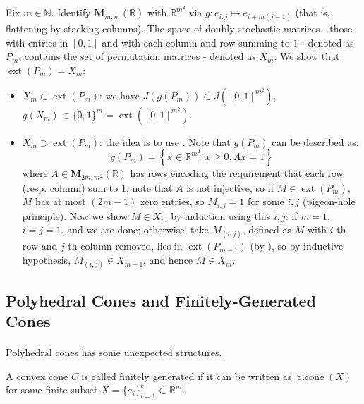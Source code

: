 \begin{exmp}
	Fix $m\in \mathbb{N}$. Identify $\mathbf{M}_{m,m}(\mathbb{R})$ with $\mathbb{R}^{m^2}$ via $g:e_{i,j}\mapsto e_{i+m(j-1)}$ (that is, flattening by stacking columns). The space of doubly stochastic matrices - those with entries in $[0,1]$ and with each column and row summing to $1$ - denoted as $P_{m}$, contains the set of permutation matrices - denoted as $X_m$. We show that $\operatorname{ext}(P_m)=X_m$:
	\begin{itemize}
		\item $X_m\subset \operatorname{ext}(P_m)$: we have $J(g(P_m))\subset J\left([0,1]^{m^2}\right)$, $g(X_m)\subset \{0,1\}^m=\operatorname{ext}\left([0,1]^{m^2}\right)$.
		\item $X_m\supset \operatorname{ext}(P_m)$: the idea is to use . Note that $g(P_m)$ can be described as:
		      \[
			      g(P_m)=\left\{
			      x\in \mathbb{R}^{m^2}:x\geq 0,Ax=1
			      \right\}
		      \]
		      where $A\in \mathbf{M}_{2m,m^2}(\mathbb{R})$ has rows encoding the requirement that each row (resp. column) sum to $1$; note that $A$ is not injective, so if $M\in \operatorname{ext}(P_m)$, $M$ has at most $(2m-1)$ zero entries, so $M_{i,j}=1$ for some $i,j$ (pigeon-hole principle). Now we show $M\in X_m$ by induction using this $i,j$: if $m=1$, $i=j=1$, and we are done; otherwise, take $M_{(i,j)}$, defined as $M$ with $i$-th row and $j$-th column removed, lies in $\operatorname{ext}(P_{m-1})$ (by ), so by inductive hypothesis, $M_{(i,j)}\in X_{m-1}$, and hence $M\in X_m$.
	\end{itemize}
\end{exmp}

\subsection{Polyhedral Cones and Finitely-Generated Cones}

\paragraph{}Polyhedral cones has some unexpected structures.

\begin{defn}\label{defn:017-fg-cones}
	A convex cone $C$ is called finitely generated if it can be written as $\operatorname{c.cone}(X)$ for some finite subset $X=\{a_i\}_{i=1}^k\subset \mathbb{R}^m$.
\end{defn}

